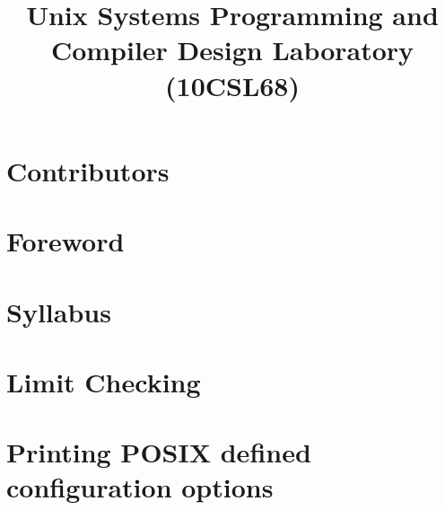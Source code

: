 \documentclass{report}
\begin{document}
\title{Unix Systems Programming and \\ Compiler Design Laboratory \\ (10CSL68)}
\maketitle

\chapter*{Contributors}


\chapter*{Foreword}


\chapter*{Syllabus}


\tableofcontents

\chapter{Limit Checking}


\chapter{Printing POSIX defined configuration options}

\end{document}
